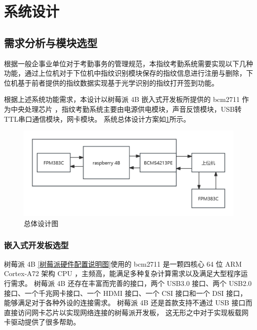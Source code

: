 \section{系统设计}

\subsection{需求分析与模块选型}

根据一般企事业单位对于考勤事务的管理规范，本指纹考勤系统需要实现以下几种功能，通过上位机对于下位机中指纹识别模块保存的指纹信息进行注册与删除，下位机基于前者提供的指纹数据实现基于光学识别的指纹打开签到功能。

根据上述系统功能需求，本设计以树莓派 4B 嵌入式开发板所提供的 bcm2711 作为中央处理芯片
，指纹考勤系统主要由电源供电模块，声音反馈模块，USB转TTL串口通信模块，网卡模块。
系统总体设计方案如\ref{总体设计图}所示。

\begin{figure}[ht]
    \centering
    \caption{总体设计图}    \label{总体设计图}
    \includegraphics[width=\textwidth]{imgs/总体设计图.png}
\end{figure}

\subsubsection{嵌入式开发板选型}

树莓派 4B \ref{树莓派硬件配置说明图}使用的 bcm2711 是一颗四核心 64 位 ARM Cortex-A72 架构 CPU ，主频高，能满足多种复杂计算需求以及满足大型程序运行需求。
树莓派 4B 还存在丰富而完善的接口，两个 USB3.0 接口、两个 USB2.0 接口、一个千兆网卡接口、一个 HDMI 接口、一个 CSI 接口和一个 DSI 接口，能够满足对于各种外设的连接需求。
树莓派 4B 还是首款支持不通过 USB 接口而直接访问网卡芯片以实现网络连接的树莓派开发板，
这无形之中对于实现板载网卡驱动提供了很多帮助。

